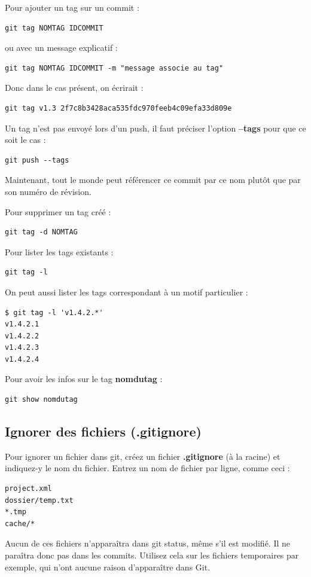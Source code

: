 \documentclass[a4paper,twoside]{article}
\begin{document}
Pour ajouter un tag sur un commit :
\begin{verbatim}
git tag NOMTAG IDCOMMIT
\end{verbatim}
ou avec un message explicatif :
\begin{verbatim}
git tag NOMTAG IDCOMMIT -m "message associe au tag"
\end{verbatim}


Donc dans le cas présent, on écrirait :
\begin{verbatim}
git tag v1.3 2f7c8b3428aca535fdc970feeb4c09efa33d809e
\end{verbatim}

Un tag n'est pas envoyé lors d'un push, il faut préciser l'option \textbf{--tags} pour que ce soit le cas :
\begin{verbatim}
git push --tags
\end{verbatim}

Maintenant, tout le monde peut référencer ce commit par ce nom plutôt que par son numéro de révision.

\bigskip

Pour supprimer un tag créé :
\begin{verbatim}
git tag -d NOMTAG
\end{verbatim}

\bigskip

Pour lister les tags existants :
\begin{verbatim}
git tag -l
\end{verbatim}

On peut aussi lister les tags correspondant à un motif particulier : 
\begin{verbatim}
$ git tag -l 'v1.4.2.*'
v1.4.2.1
v1.4.2.2
v1.4.2.3
v1.4.2.4
\end{verbatim}

\bigskip

Pour avoir les infos sur le tag \textbf{nomdutag} : 
\begin{verbatim}
git show nomdutag
\end{verbatim}



\subsection{Ignorer des fichiers (.gitignore)}\label{sec:gitignore}
Pour ignorer un fichier dans git, créez un fichier \textbf{.gitignore} (à la racine) et indiquez-y le nom du fichier. Entrez un nom de fichier par ligne, comme ceci :
\begin{verbatim}
project.xml
dossier/temp.txt
*.tmp
cache/*
\end{verbatim}
Aucun de ces fichiers n'apparaîtra dans git status, même s'il est modifié. Il ne paraîtra donc pas dans les commits.
Utilisez cela sur les fichiers temporaires par exemple, qui n'ont aucune raison d'apparaître dans Git.
\end{document}
